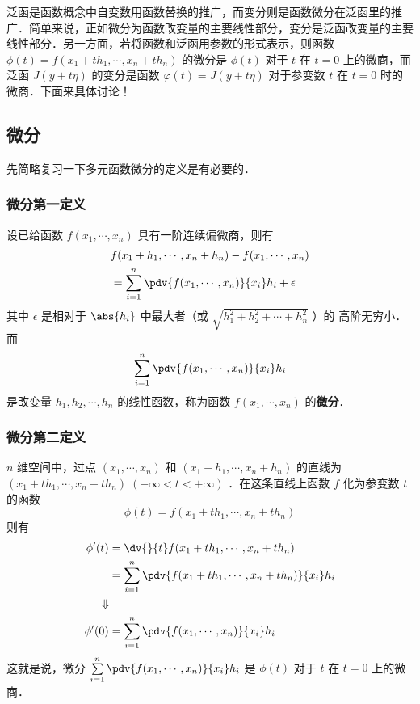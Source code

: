 
泛函是函数概念中自变数用函数替换的推广，而变分则是函数微分在泛函里的推广．简单来说，正如微分为函数改变量的主要线性部分，变分是泛函改变量的主要线性部分．另一方面，若将函数和泛函用参数的形式表示，则函数$\phi(t)=f(x_1+th_1,\cdots,x_n+th_n) $ 的微分是 $\phi(t)$ 对于 $t$ 在 $t=0$ 上的微商，而泛函 $J(y+t\eta)$ 的变分是函数 $\varphi(t)=J(y+t\eta)$ 对于参变数 $t$ 在 $t=0$ 时的微商．下面来具体讨论！
\subsection{微分}
先简略复习一下多元函数微分的定义是有必要的．
\subsubsection{微分第一定义}
设已给函数 $f(x_1,\cdots,x_n)$ 具有一阶连续偏微商，则有
\begin{equation}
\begin{aligned}
&f(x_1+h_1,\cdots,x_n+h_n)-f(x_1,\cdots,x_n)\\
&=\sum_{i=1}^{n} \pdv{f(x_1,\cdots,x_n)}{x_i}h_i+\epsilon
\end{aligned}
\end{equation}
其中 $\epsilon$ 是相对于 $\abs{h_i}$ 中最大者（或 $\sqrt{h_1^2+h_2^2+\cdots+h_n^2}$ ）的 高阶无穷小．而 
\begin{equation}
\sum_{i=1}^{n} \pdv{f(x_1,\cdots,x_n)}{x_i}h_i
\end{equation}
是改变量 $h_1,h_2,\cdots,h_n$ 的线性函数，称为函数 $f(x_1,\cdots,x_n)$ 的\textbf{微分}．
\subsubsection{微分第二定义}
$n$ 维空间中，过点 $(x_1,\cdots,x_n)$ 和 $(x_1+h_1,\cdots,x_n+h_n)$ 的直线为 $(x_1+th_1,\cdots,x_n+th_n)\;(-\infty<t<+\infty)$ ．在这条直线上函数 $f$ 化为参变数 $t$ 的函数
\begin{equation}
\phi(t)=f(x_1+th_1,\cdots,x_n+th_n) 
\end{equation}
则有
\begin{equation}
\begin{aligned}
\phi'(t)&=\dv{}{t}f(x_1+th_1,\cdots,x_n+th_n) \\
&=\sum_{i=1}^n\pdv{f(x_1+th_1,\cdots,x_n+th_n)}{x_i}h_i
\\
\Downarrow
\\
\phi'(0)&=\sum_{i=1}^n\pdv{f(x_1,\cdots,x_n)}{x_i}h_i
\end{aligned}
\end{equation}
这就是说，微分 $\sum\limits_{i=1}^n\pdv{f(x_1,\cdots,x_n)}{x_i}h_i$ 是 $\phi(t)$ 对于 $t$ 在 $t=0$ 上的微商．
